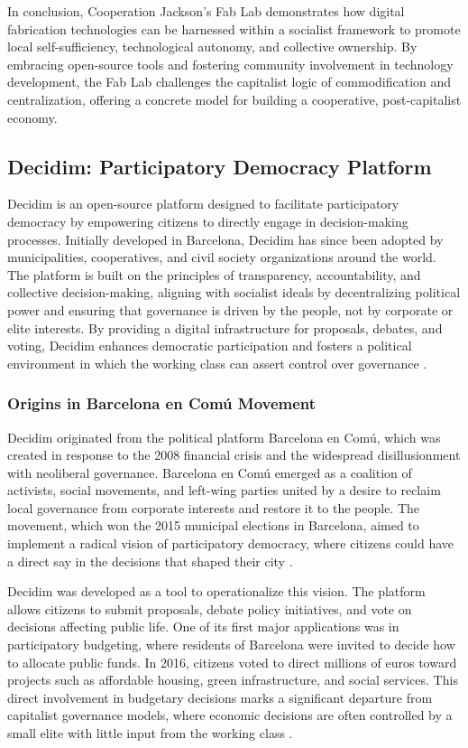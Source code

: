 \begin{refsection}
In conclusion, Cooperation Jackson's Fab Lab demonstrates how digital fabrication technologies can be harnessed within a socialist framework to promote local self-sufficiency, technological autonomy, and collective ownership. By embracing open-source tools and fostering community involvement in technology development, the Fab Lab challenges the capitalist logic of commodification and centralization, offering a concrete model for building a cooperative, post-capitalist economy.

\subsection{Decidim: Participatory Democracy Platform}

Decidim is an open-source platform designed to facilitate participatory democracy by empowering citizens to directly engage in decision-making processes. Initially developed in Barcelona, Decidim has since been adopted by municipalities, cooperatives, and civil society organizations around the world. The platform is built on the principles of transparency, accountability, and collective decision-making, aligning with socialist ideals by decentralizing political power and ensuring that governance is driven by the people, not by corporate or elite interests. By providing a digital infrastructure for proposals, debates, and voting, Decidim enhances democratic participation and fosters a political environment in which the working class can assert control over governance \cite[pp.~18-38]{blanco2020urban}.

\subsubsection{Origins in Barcelona en Comú Movement}

Decidim originated from the political platform Barcelona en Comú, which was created in response to the 2008 financial crisis and the widespread disillusionment with neoliberal governance. Barcelona en Comú emerged as a coalition of activists, social movements, and left-wing parties united by a desire to reclaim local governance from corporate interests and restore it to the people. The movement, which won the 2015 municipal elections in Barcelona, aimed to implement a radical vision of participatory democracy, where citizens could have a direct say in the decisions that shaped their city \cite[pp.~18-38]{blanco2020urban}.

Decidim was developed as a tool to operationalize this vision. The platform allows citizens to submit proposals, debate policy initiatives, and vote on decisions affecting public life. One of its first major applications was in participatory budgeting, where residents of Barcelona were invited to decide how to allocate public funds. In 2016, citizens voted to direct millions of euros toward projects such as affordable housing, green infrastructure, and social services. This direct involvement in budgetary decisions marks a significant departure from capitalist governance models, where economic decisions are often controlled by a small elite with little input from the working class \cite[pp.~120-136]{marx2018}.


\end{refsection}
